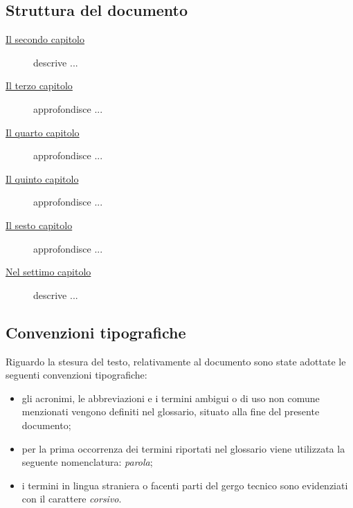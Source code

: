 \subsection{Struttura del documento}
\label{sec:organizzazione-testo}

\begin{description}
    \item[{\hyperref[cap:processi-metodologie]{Il secondo capitolo}}] descrive ...
    
    \item[{\hyperref[cap:descrizione-stage]{Il terzo capitolo}}] approfondisce ...
    
    \item[{\hyperref[cap:analisi-requisiti]{Il quarto capitolo}}] approfondisce ...
    
    \item[{\hyperref[cap:progettazione-codifica]{Il quinto capitolo}}] approfondisce ...
    
    \item[{\hyperref[cap:verifica-validazione]{Il sesto capitolo}}] approfondisce ...
    
    \item[{\hyperref[cap:conclusioni]{Nel settimo capitolo}}] descrive ...
\end{description}

\subsection{Convenzioni tipografiche}
\label{sec:convenzioni-tipografiche}

Riguardo la stesura del testo, relativamente al documento sono state adottate le seguenti convenzioni tipografiche:
\begin{itemize}
	\item gli acronimi, le abbreviazioni e i termini ambigui o di uso non comune menzionati vengono definiti nel glossario, situato alla fine del presente documento;
	\item per la prima occorrenza dei termini riportati nel glossario viene utilizzata la seguente nomenclatura: \emph{parola}\glsfirstoccur;
	\item i termini in lingua straniera o facenti parti del gergo tecnico sono evidenziati con il carattere \emph{corsivo}.
\end{itemize}
